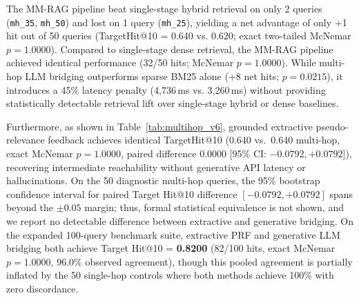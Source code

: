 \documentclass[conference]{IEEEtran}
\begin{document}
\begin{table}[htbp]
\centering
\small
\caption{Exact paired discordant case analysis and two-tailed McNemar tests across the 50 diagnostic multi-hop queries. Comparison of Multi-Hop LLM Bridging against Single-Stage Hybrid, Single-Stage Dense, and Sparse BM25 baselines. While LLM bridging outperforms sparse BM25 alone (+8 net hits, $p = 0.0215$), it yields no statistically detectable retrieval improvement over single-stage hybrid (+1 net hit, $p = 1.000$) or single-stage dense (identical 32/50 hits, $p = 1.000$).}
\label{tab:multihop_paired_v3}
\end{table}

The MM-RAG pipeline beat single-stage hybrid retrieval on only 2 queries (\texttt{mh\_35}, \texttt{mh\_50}) and lost on 1 query (\texttt{mh\_25}), yielding a net advantage of only +1 hit out of 50 queries (TargetHit@10 = 0.640 vs. 0.620; exact two-tailed McNemar $p = 1.0000$). Compared to single-stage dense retrieval, the MM-RAG pipeline achieved identical performance (32/50 hits; McNemar $p = 1.0000$). While multi-hop LLM bridging outperforms sparse BM25 alone (+8 net hits; $p = 0.0215$), it introduces a 45\% latency penalty (4,736\,ms vs. 3,260\,ms) without providing statistically detectable retrieval lift over single-stage hybrid or dense baselines.

Furthermore, as shown in Table~\ref{tab:multihop_v6}, grounded extractive pseudo-relevance feedback achieves identical TargetHit@10 (0.640 vs.\ 0.640 multi-hop, exact McNemar $p = 1.0000$, paired difference $0.0000$ [95\% CI: $-0.0792, +0.0792$]), recovering intermediate reachability without generative API latency or hallucinations. On the 50 diagnostic multi-hop queries, the 95\% bootstrap confidence interval for paired Target Hit@10 difference $[-0.0792, +0.0792]$ spans beyond the $\pm 0.05$ margin; thus, formal statistical equivalence is not shown, and we report no detectable difference between extractive and generative bridging. On the expanded 100-query benchmark suite, extractive PRF and generative LLM bridging both achieve Target Hit@10 = \textbf{0.8200} (82/100 hits, exact McNemar $p = 1.0000$, $96.0\%$ observed agreement), though this pooled agreement is partially inflated by the 50 single-hop controls where both methods achieve 100\% with zero discordance.
\end{document}

